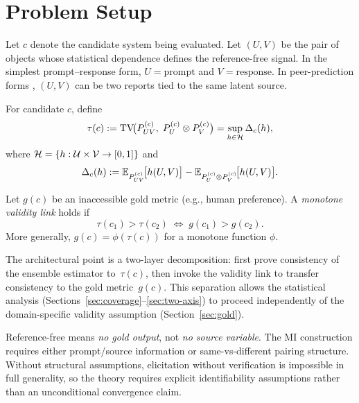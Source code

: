 \section{Problem Setup}
\label{sec:setup}

Let $c$ denote the candidate system being evaluated. Let $(U, V)$ be the
pair of objects whose statistical dependence defines the reference-free signal.
In the simplest prompt--response form, $U = \text{prompt}$ and $V =
\text{response}$. In peer-prediction forms \citep{robertson2026information},
$(U, V)$ can be two reports tied to the same latent source.

\begin{definition}
\label{def:tvd-mi-target}
For candidate $c$, define
\begin{equation}
\tau(c)
:= \mathrm{TV}\!\big(P^{(c)}_{UV},\; P^{(c)}_{U} \otimes P^{(c)}_{V}\big)
= \sup_{h \in \mathcal{H}} \Delta_c(h),
\end{equation}
where $\mathcal{H} = \{h : \mathcal{U} \times \mathcal{V} \to [0,1]\}$ and
\begin{equation}
\Delta_c(h)
:= \mathbb{E}_{P^{(c)}_{UV}}\!\big[h(U,V)\big]
   - \mathbb{E}_{P^{(c)}_{U} \otimes P^{(c)}_{V}}\!\big[h(U,V)\big].
\end{equation}
\end{definition}

\begin{definition}
\label{def:gold-metric}
Let $g(c)$ be an inaccessible gold metric (e.g., human preference).
A \emph{monotone validity link} holds if
\begin{equation}
\tau(c_1) > \tau(c_2) \;\Longleftrightarrow\; g(c_1) > g(c_2).
\end{equation}
More generally, $g(c) = \phi(\tau(c))$ for a monotone function $\phi$.
\end{definition}

\begin{remark}
The architectural point is a two-layer decomposition: first prove consistency
of the ensemble estimator to~$\tau(c)$, then invoke the validity link to
transfer consistency to the gold metric~$g(c)$. This separation allows the
statistical analysis (Sections~\ref{sec:coverage}--\ref{sec:two-axis}) to
proceed independently of the domain-specific validity assumption
(Section~\ref{sec:gold}).
\end{remark}

\begin{remark}
Reference-free means \emph{no gold output}, not \emph{no source variable}.
The MI construction requires either prompt/source information or
same-vs-different pairing structure. Without structural assumptions,
elicitation without verification is impossible in full generality, so the
theory requires explicit identifiability assumptions rather than an
unconditional convergence claim.
\end{remark}

